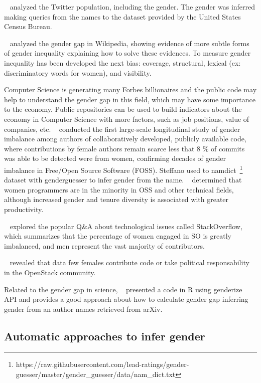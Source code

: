 \documentclass[a4paper]{article}
\begin{document}
~\cite{mislove2011understanding} analyzed the Twitter population,
including the gender. The gender was inferred making queries
from the names to the dataset provided by the United States Census
Bureau.

~\cite{wagner2015s} analyzed the gender gap in Wikipedia,
showing evidence of more subtle forms of gender inequality explaining
how to solve these evidences. To measure gender inequality has been
developed the next bias: coverage, structural, lexical (ex:
discriminatory words for women), and visibility.

Computer Science is generating many Forbes billionaires and the public
code may help to understand the gender gap in this field, which may
have some importance to the economy. Public repositories can
be used to build indicators about the economy in Computer Science with
more factors, such as job positions, value of companies, etc.
~\cite{zacchiroli2020gender} conducted the first large-scale
longitudinal study of gender imbalance among authors of
collaboratively developed, publicly available code, where
contributions by female authors remain scarce less that 8 \% of
commits was able to be detected were from women, confirming decades of
gender imbalance in Free/Open Source Software (FOSS). Steffano used
to namdict~\footnote{https://raw.githubusercontent.com/lead-ratings/gender-guesser/master/gender_guesser/data/nam_dict.txt} dataset with genderguesser to infer gender from
the name. ~\cite{vasilescu2015gender} determined that women programmers
are in the minority in OSS and other technical fields, although increased
gender and tenure diversity is associated with greater productivity.

~\cite{vasilescu2012gender} explored the popular Q\&A about
technological issues called StackOverflow, which summarizes that the
percentage of women engaged in SO is greatly imbalanced, and men
represent the vast majority of contributors.

~\cite{izquierdo2018openstack} revealed that data few females
contribute code or take political responsability in the OpenStack community.

Related to the gender gap in science, ~\cite{holman2018gender} presented a
code in R using genderize API and provides a good approach about how to
calculate gender gap inferring gender from an author names retrieved from
arXiv.

\subsection{Automatic approaches to infer gender}
\end{document}
